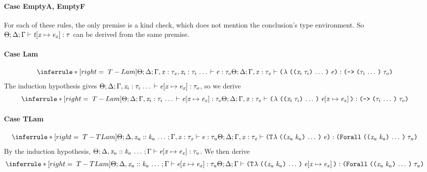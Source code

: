 \begin{sproof}
  \paragraph{Case {\sc EmptyA}, {\sc EmptyF}}
  For each of these rules,
  the only premise is a kind check,
  which  does not mention the conclusion's type environment.
  So $\Theta;\Delta;\Gamma \vdash \mathit{t}\hspace{-2pt}\left[ \mathit{x} \mapsto \mathit{e}_{\mathit{x}} \right] : \mathit{\tau}$
  can be derived from the same premise.
  \paragraph{Case {\sc Lam}}
  \[{\infr[T-Lam]
    {\typeof{\sEnv}{\kEnv}
      {\tEnv, \hastype{\var}{\type_{\var}}, \sequence{\hastype{\var_i}{\type_i}}}
      {\expr}{\type_o}}
    {\typeof{\sEnv}{\kEnv}{\tEnv, \hastype{\var}{\type_{\var}}}
      {\lam{\sequence{\notevar{\var_i}{\type_i}}}{\expr}}
      {\typefun{\sequence{\type_i}}{\type_o}}}}\]
  The induction hypothesis gives
  $\Theta;\Delta;\Gamma, \mathit{x}_i : \mathit{\tau}_i \, \ldots \, \vdash \mathit{e}\hspace{-2pt}\left[ \mathit{x} \mapsto \mathit{e}_{\mathit{x}} \right] : \mathit{\tau}_o$,
  so we derive
  \[{\infr[T-Lam]
    {\typeof{\sEnv}{\kEnv}
      {\tEnv, \sequence{\hastype{\var_i}{\type_i}}}
      {\exprsubst{\expr}}{\type_o}}
    {\typeof{\sEnv}{\kEnv}{\tEnv, \hastype{\var}{\type_{\var}}}
      {\lam{\sequence{\notevar{\var_i}{\type_i}}}{\exprsubst{\expr}}}
      {\typefun{\sequence{\type_i}}{\type_o}}}}\]
  \paragraph{Case {\sc TLam}}
  \[{\infr[T-TLam]
    {\typeof{\sEnv}{\kEnv, \sequence{\haskind{\var_u}{\kind_u}}}{\tEnv, \hastype{\var}{\type_{\var}}}
      {\expr}
      {\type_u}}
    {\typeof{\sEnv}{\kEnv}{\tEnv, \hastype{\var}{\type_{\var}}}
      {\tlam{\sequence{\notevar{\var_u}{\kind_u}}}{\expr}}
      {\typeuniv{\sequence{\notevar{\var_u}{\kind_u}}}{\type_u}}}}\]
  By the induction hypothesis,
  $\Theta;\Delta, \mathit{x}_u :: \mathit{k}_u \, \ldots \,;\Gamma \vdash \mathit{e}\hspace{-2pt}\left[ \mathit{x} \mapsto \mathit{e}_{\mathit{x}} \right] : \mathit{\tau}_u$.
  We then derive
  \[{\infr[T-TLam]
    {\typeof{\sEnv}{\kEnv, \sequence{\haskind{\var_u}{\kind_u}}}{\tEnv}
      {\exprsubst{\expr}}
      {\type_u}}
    {\typeof{\sEnv}{\kEnv}{\tEnv}
      {\tlam{\sequence{\notevar{\var_u}{\kind_u}}}{\exprsubst{\expr}}}
      {\typeuniv{\sequence{\notevar{\var_u}{\kind_u}}}{\type_u}}}}\]

\end{sproof}
